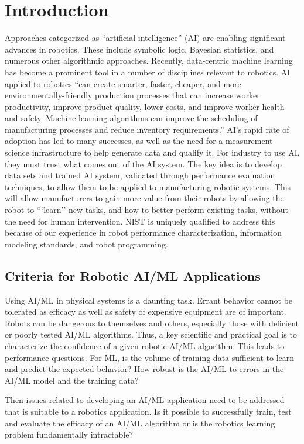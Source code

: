 \newpage
\section{Introduction}
\sloppy
Approaches categorized as ``artificial intelligence'' (AI) are enabling significant advances in robotics. These include symbolic logic, Bayesian statistics, and numerous other algorithmic approaches. Recently, data-centric machine learning has become a prominent tool in a number of disciplines relevant to robotics.  AI applied to robotics ``can create smarter, faster, cheaper, and more environmentally-friendly production processes that can increase worker productivity, improve product quality, lower costs, and improve worker health and safety. Machine learning algorithms can improve the scheduling of manufacturing processes and reduce inventory requirements.''  AI's rapid rate of adoption has led to many successes, as well as the need for a measurement science infrastructure to help generate data and qualify it.  For industry to use AI, they must trust what comes out of the AI system. The key idea is to develop data sets and trained AI system, validated through performance evaluation techniques, to allow them to be applied to manufacturing robotic systems. This will allow manufacturers to gain more value from their robots by allowing the robot to ```learn'' new tasks, and how to better perform existing tasks, without the need for human intervention. NIST is uniquely qualified to address this because of our experience in robot performance characterization, information modeling standards, and robot programming.

\subsection{Criteria for Robotic AI/ML Applications}
Using AI/ML in physical systems is a daunting task. Errant behavior cannot be tolerated as efficacy as well as safety of expensive equipment are of important. Robots can be dangerous to themselves and others, especially those with deficient or poorly tested AI/ML algorithms. Thus, a key scientific and practical goal is to characterize the confidence of a given robotic AI/ML algorithm. This leads to performance  questions. For ML, is the volume of training data sufficient to learn and predict the expected behavior? How robust is the AI/ML to errors in the AI/ML model and the training data? 

Then issues related to developing an AI/ML application need to be addressed that is suitable to a robotics application. Is it possible to successfully train, test and evaluate the efficacy of an AI/ML algorithm or is the robotics learning problem fundamentally intractable?

